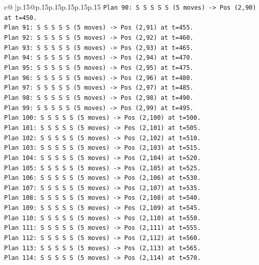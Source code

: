 \documentclass{article}
\begin{document}
{\begin{supertabular}{c@{$\;$}|p{.15\linewidth}@{}p{.15\linewidth}p{.15\linewidth}p{.15\linewidth}p{.15\linewidth}p{.15\linewidth}}
{{{\texttt{Plan 90: S S S S S (5 moves) {-}> Pos (2,90) at t=450.} \\
\texttt{Plan 91: S S S S S (5 moves) {-}> Pos (2,91) at t=455.} \\
\texttt{Plan 92: S S S S S (5 moves) {-}> Pos (2,92) at t=460.} \\
\texttt{Plan 93: S S S S S (5 moves) {-}> Pos (2,93) at t=465.} \\
\texttt{Plan 94: S S S S S (5 moves) {-}> Pos (2,94) at t=470.} \\
\texttt{Plan 95: S S S S S (5 moves) {-}> Pos (2,95) at t=475.} \\
\texttt{Plan 96: S S S S S (5 moves) {-}> Pos (2,96) at t=480.} \\
\texttt{Plan 97: S S S S S (5 moves) {-}> Pos (2,97) at t=485.} \\
\texttt{Plan 98: S S S S S (5 moves) {-}> Pos (2,98) at t=490.} \\
\texttt{Plan 99: S S S S S (5 moves) {-}> Pos (2,99) at t=495.} \\
\texttt{Plan 100: S S S S S (5 moves) {-}> Pos (2,100) at t=500.} \\
\texttt{Plan 101: S S S S S (5 moves) {-}> Pos (2,101) at t=505.} \\
\texttt{Plan 102: S S S S S (5 moves) {-}> Pos (2,102) at t=510.} \\
\texttt{Plan 103: S S S S S (5 moves) {-}> Pos (2,103) at t=515.} \\
\texttt{Plan 104: S S S S S (5 moves) {-}> Pos (2,104) at t=520.} \\
\texttt{Plan 105: S S S S S (5 moves) {-}> Pos (2,105) at t=525.} \\
\texttt{Plan 106: S S S S S (5 moves) {-}> Pos (2,106) at t=530.} \\
\texttt{Plan 107: S S S S S (5 moves) {-}> Pos (2,107) at t=535.} \\
\texttt{Plan 108: S S S S S (5 moves) {-}> Pos (2,108) at t=540.} \\
\texttt{Plan 109: S S S S S (5 moves) {-}> Pos (2,109) at t=545.} \\
\texttt{Plan 110: S S S S S (5 moves) {-}> Pos (2,110) at t=550.} \\
\texttt{Plan 111: S S S S S (5 moves) {-}> Pos (2,111) at t=555.} \\
\texttt{Plan 112: S S S S S (5 moves) {-}> Pos (2,112) at t=560.} \\
\texttt{Plan 113: S S S S S (5 moves) {-}> Pos (2,113) at t=565.} \\
\texttt{Plan 114: S S S S S (5 moves) {-}> Pos (2,114) at t=570.} \\
}}}
\end{supertabular}}
\end{document}
